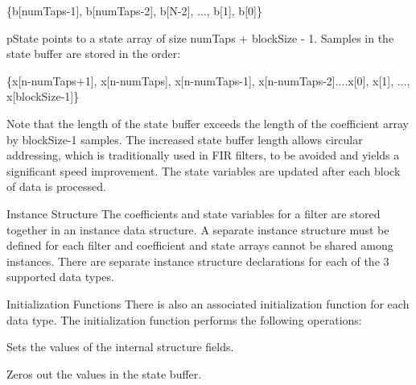 \begin{DoxyParagraph}{}

\begin{DoxyPre}    
    \{b[numTaps-1], b[numTaps-2], b[N-2], ..., b[1], b[0]\}    
 \end{DoxyPre}
 
\end{DoxyParagraph}
\begin{DoxyParagraph}{}
{\ttfamily p\-State} points to a state array of size {\ttfamily num\-Taps + block\-Size -\/ 1}. Samples in the state buffer are stored in the order\-: 
\end{DoxyParagraph}
\begin{DoxyParagraph}{}

\begin{DoxyPre}    
    \{x[n-numTaps+1], x[n-numTaps], x[n-numTaps-1], x[n-numTaps-2]....x[0], x[1], ..., x[blockSize-1]\}    
 \end{DoxyPre}
 
\end{DoxyParagraph}
\begin{DoxyParagraph}{}
Note that the length of the state buffer exceeds the length of the coefficient array by {\ttfamily block\-Size-\/1} samples. The increased state buffer length allows circular addressing, which is traditionally used in F\-I\-R filters, to be avoided and yields a significant speed improvement. The state variables are updated after each block of data is processed. 
\end{DoxyParagraph}
\begin{DoxyParagraph}{Instance Structure }
The coefficients and state variables for a filter are stored together in an instance data structure. A separate instance structure must be defined for each filter and coefficient and state arrays cannot be shared among instances. There are separate instance structure declarations for each of the 3 supported data types.
\end{DoxyParagraph}
\begin{DoxyParagraph}{Initialization Functions }
There is also an associated initialization function for each data type. The initialization function performs the following operations\-:
\begin{DoxyItemize}
\item Sets the values of the internal structure fields.
\item Zeros out the values in the state buffer. 
\end{DoxyItemize}
\end{DoxyParagraph}

